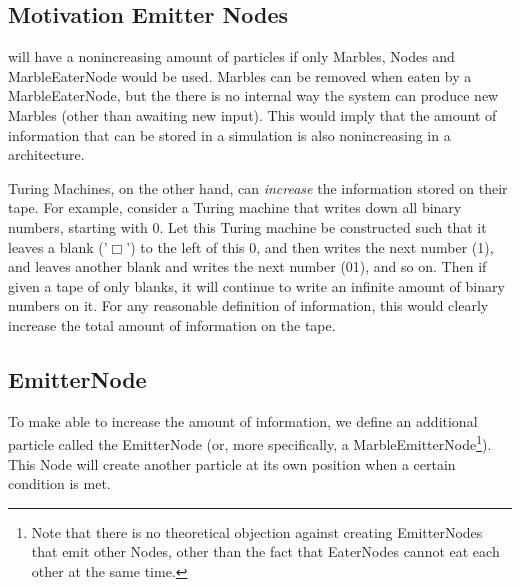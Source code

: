 \subsection{Motivation Emitter Nodes}
\nenwin will have a nonincreasing amount of particles if only Marbles, Nodes and MarbleEaterNode would be used.
Marbles can be removed when eaten by a MarbleEaterNode, but the there is no internal way the system can produce new Marbles (other than awaiting new input).
This would imply that the amount of information that can be stored in a \nenwin simulation is also nonincreasing in a \nenwin architecture.

Turing Machines, on the other hand, can \textit{increase} the information stored on their tape. For example, consider a Turing machine that writes down all binary numbers, starting with 0. Let this Turing machine be constructed such that it leaves a blank ('$\Box$') to the left of this 0, and then writes the next number (1), and leaves another blank and writes the next number (01), and so on. Then if given a tape of only blanks, it will continue to write an infinite amount of binary numbers on it. For any reasonable definition of information, this would clearly increase the total amount of information on the tape. 

\subsection{EmitterNode}
To make \nenwin able to increase the amount of information, we define an additional particle called the EmitterNode (or, more specifically, a MarbleEmitterNode\footnote{Note that there is no theoretical objection against creating EmitterNodes that emit other Nodes, other than the fact that EaterNodes cannot eat each other at the same time.}). This Node will create another particle at its own position when a certain condition is met.

